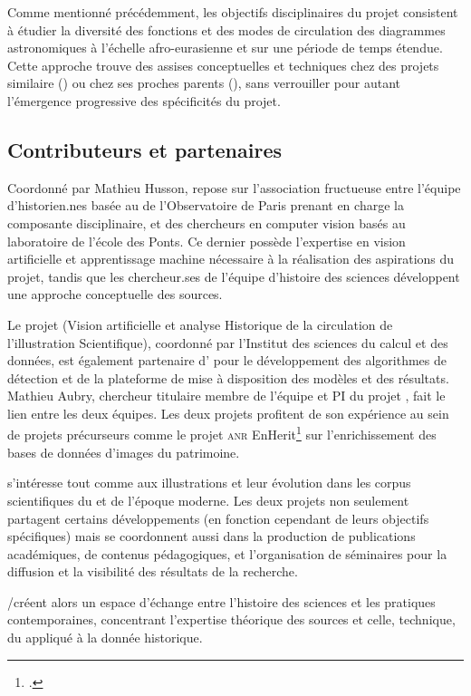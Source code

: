 Comme mentionné précédemment, les objectifs disciplinaires du projet
consistent à étudier la diversité des fonctions et des modes de
circulation des diagrammes astronomiques à l'échelle afro-eurasienne et
sur une période de temps étendue. Cette approche trouve des assises
conceptuelles et techniques chez des projets similaire (\vhs) ou chez ses
proches parents (\dishas), sans verrouiller pour autant l'émergence
progressive des spécificités du projet.

\hypertarget{contributeurs-et-partenaires}{%
\subsection{Contributeurs et
partenaires}\label{contributeurs-et-partenaires}}

Coordonné par Mathieu Husson, \eida repose sur l'association fructueuse
entre l'équipe d'historien.nes basée au \syrte de l'Observatoire de Paris
prenant en charge la composante disciplinaire, et des chercheurs en
computer vision basés au laboratoire \imagine de l'école des Ponts. Ce
dernier possède l'expertise en vision artificielle et apprentissage
machine nécessaire à la réalisation des aspirations du projet, tandis
que les chercheur.ses de l'équipe d'histoire des sciences développent une
approche conceptuelle des sources.

Le projet \vhs (Vision artificielle et analyse Historique de la
circulation de l'illustration Scientifique), coordonné par l'Institut
des sciences du calcul et des données, est également partenaire d'\eida
pour le développement des algorithmes de détection et de la plateforme
de mise à disposition des modèles et des résultats. Mathieu Aubry,
chercheur titulaire membre de l'équipe \imagine et PI du projet \vhs, fait
le lien entre les deux équipes. Les deux projets profitent de son
expérience au sein de projets précurseurs comme le projet \textsc{anr}
EnHerit\footcite{noauthor_enhancing_nodate} sur
l'enrichissement des bases de données d'images du patrimoine.

\vhs s'intéresse tout comme \eida aux illustrations et leur évolution dans
les corpus scientifiques du \ma et de l'époque moderne. Les deux projets
non seulement partagent certains développements (en fonction cependant
de leurs objectifs spécifiques) mais se coordonnent aussi dans la
production de publications académiques, de contenus pédagogiques, et
l'organisation de séminaires pour la diffusion et la visibilité des
résultats de la recherche.

\eida/\vhs créent alors un espace d'échange entre l'histoire des sciences
et les pratiques contemporaines, concentrant l'expertise théorique des
sources et celle, technique, du \dl appliqué à la donnée
historique.

